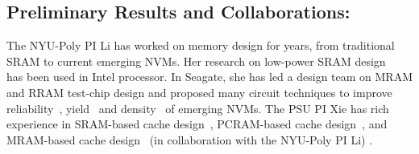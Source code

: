 \subsection{Preliminary Results and Collaborations:}
The NYU-Poly PI Li has worked on memory design for years, from traditional SRAM to current emerging NVMs. Her research on low-power SRAM design ~\cite{Agarwal02,Agarwal03,Bhunia02} has been used in Intel processor. In Seagate, she has led a design team on MRAM and RRAM test-chip design and proposed many circuit techniques to improve reliability~\cite{Chen:198516,Li:502194}, yield~\cite{Li:147723,Chen:147727} and density~\cite{Li:242331,Chen:170549,Li:250027,Li:426098} of emerging NVMs. The PSU PI Xie has rich experience in SRAM-based cache design~\cite{Xie:TC09,XIE:TVLSI2008-3DCacti,Xie:MTDT09,Xie:ISCA09,xie:iccd05-3d}, PCRAM-based cache design~\cite{xie:glsvisl08-pram}, and MRAM-based cache design~\cite{XIE:HPCA09,Xie:dac08} (in collaboration with the NYU-Poly PI Li) .


